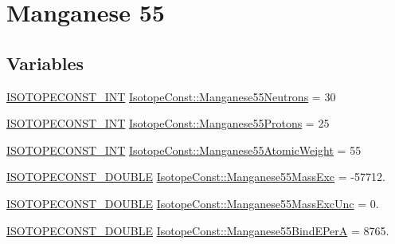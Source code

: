 \hypertarget{group___isotope_const-_manganese-_mn55}{}\section{Manganese 55}
\label{group___isotope_const-_manganese-_mn55}
\subsection*{Variables}
\begin{DoxyCompactItemize}
\item 
\mbox{\hyperlink{group___isotope_const-_macros_ga5f18360b3e99483a35c32d789e62621c}{I\+S\+O\+T\+O\+P\+E\+C\+O\+N\+S\+T\+\_\+\+I\+NT}} \mbox{\hyperlink{group___isotope_const-_manganese-_mn55_ga030408bc96f6cb9312e590510f2bffba}{Isotope\+Const\+::\+Manganese55\+Neutrons}} = 30
\item 
\mbox{\hyperlink{group___isotope_const-_macros_ga5f18360b3e99483a35c32d789e62621c}{I\+S\+O\+T\+O\+P\+E\+C\+O\+N\+S\+T\+\_\+\+I\+NT}} \mbox{\hyperlink{group___isotope_const-_manganese-_mn55_ga06f71f245ec2cff58eac56c8b6e3cd71}{Isotope\+Const\+::\+Manganese55\+Protons}} = 25
\item 
\mbox{\hyperlink{group___isotope_const-_macros_ga5f18360b3e99483a35c32d789e62621c}{I\+S\+O\+T\+O\+P\+E\+C\+O\+N\+S\+T\+\_\+\+I\+NT}} \mbox{\hyperlink{group___isotope_const-_manganese-_mn55_ga6520ab999efbf8fc8cb4a264ca30e8a4}{Isotope\+Const\+::\+Manganese55\+Atomic\+Weight}} = 55
\item 
\mbox{\hyperlink{group___isotope_const-_macros_ga8f45a7272ce02c0b4c65c44636ed719a}{I\+S\+O\+T\+O\+P\+E\+C\+O\+N\+S\+T\+\_\+\+D\+O\+U\+B\+LE}} \mbox{\hyperlink{group___isotope_const-_manganese-_mn55_ga6fbe24781375726f57bdf2a268d6f691}{Isotope\+Const\+::\+Manganese55\+Mass\+Exc}} = -\/57712.
\item 
\mbox{\hyperlink{group___isotope_const-_macros_ga8f45a7272ce02c0b4c65c44636ed719a}{I\+S\+O\+T\+O\+P\+E\+C\+O\+N\+S\+T\+\_\+\+D\+O\+U\+B\+LE}} \mbox{\hyperlink{group___isotope_const-_manganese-_mn55_gae3c9122c5c1aedb26cdaf451709fbb1f}{Isotope\+Const\+::\+Manganese55\+Mass\+Exc\+Unc}} = 0.
\item 
\mbox{\hyperlink{group___isotope_const-_macros_ga8f45a7272ce02c0b4c65c44636ed719a}{I\+S\+O\+T\+O\+P\+E\+C\+O\+N\+S\+T\+\_\+\+D\+O\+U\+B\+LE}} \mbox{\hyperlink{group___isotope_const-_manganese-_mn55_ga11304818b8f91254a830fcf2d5eefb32}{Isotope\+Const\+::\+Manganese55\+Bind\+E\+PerA}} = 8765.
\item 

\end{DoxyCompactItemize}
